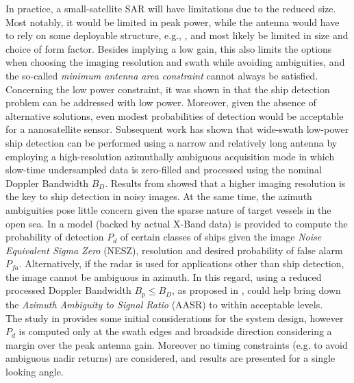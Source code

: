 \documentclass[conference,a4paper]{IEEEtran}
\begin{document}
    In practice, a small-satellite SAR will have limitations due to the reduced size.
    Most notably, it would be limited in peak power, while the antenna would have to rely on some deployable structure, e.g., \cite{Annalisa}, and most likely be limited in size and choice of form factor.
    Besides implying a low gain, this also limits the options when choosing the imaging resolution and swath while avoiding ambiguities, and the so-called \emph{minimum antenna area constraint} \cite{curlander1991synthetic} cannot always be satisfied.\\
    Concerning the low power constraint, it was shown in \cite{JAN} that the ship detection problem can be addressed with low power.
    Moreover, given the absence of alternative solutions, even modest probabilities of detection would be acceptable for a nanosatellite sensor.
    Subsequent work \cite{DLRjournal} has shown that wide-swath low-power ship detection can be performed using a narrow and relatively long antenna by employing a high-resolution azimuthally ambiguous acquisition mode in which slow-time undersampled data is zero-filled and processed using the nominal Doppler Bandwidth $B_D$.
    Results from \cite{JAN, DLRjournal} showed that a higher imaging resolution is the key to ship detection in noisy images.
    At the same time, the azimuth ambiguities pose little concern given the sparse nature of target vessels in the open sea.
    In \cite{DLRjournal} a model (backed by actual X-Band data) is provided to compute the probability of detection $P_d$ of certain classes of ships given the image \emph{Noise Equivalent Sigma Zero} (NESZ), resolution and desired probability of false alarm $P_{fa}$.
    Alternatively, if the radar is used for applications other than ship detection, the image cannot be ambiguous in azimuth.
    In this regard, using a reduced processed Doppler Bandwidth $B_p \leq B_D$, as proposed in \cite{freeman2018design}, could help bring down the \emph{Azimuth Ambiguity to Signal Ratio} (AASR) to within acceptable levels.\\
    The study in \cite{DLRjournal} provides some initial considerations for the system design, however $P_d$ is computed only at the swath edges and broadside direction considering a margin over the peak antenna gain. Moreover no timing constraints (e.g. to avoid ambiguous nadir returns) are considered, and results are presented for a single looking angle.
\end{document}

